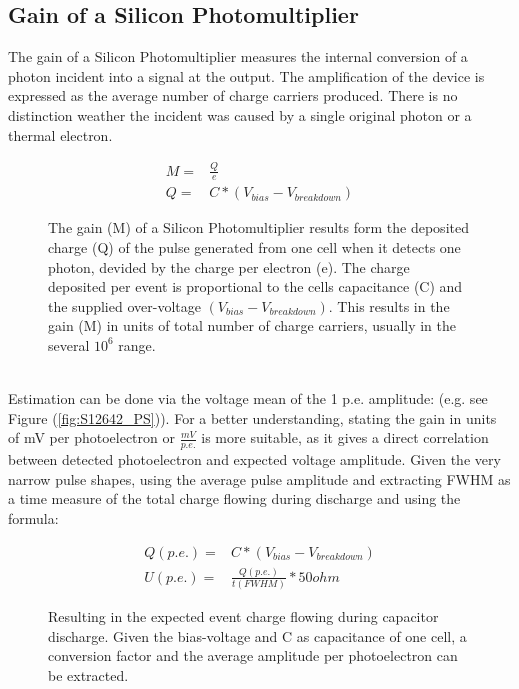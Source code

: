 \documentclass[12pt,article,type=msc,colorback,accentcolor=tud9c]{tudthesis}
\begin{document}
\subsection{Gain of a Silicon Photomultiplier}
\label{subsec:SiPMGain}
The gain of a Silicon Photomultiplier measures the internal conversion of a photon incident into a signal at the output. The amplification of the device is expressed as the average number of charge carriers produced. There is no distinction weather the incident was caused by a single original photon or a thermal electron.
\begin{figure}[h]
\begin{equation}
\begin{split}
M = & \frac{Q}{e} \\
Q = &  C * (V_{bias}-V_{breakdown})
\end{split}
\end{equation}
\label{eq:Gain_conversion_formula}
\caption{The gain (M) of a Silicon Photomultiplier results form the deposited charge (Q) of the pulse generated from one cell when it detects one photon, devided by the charge per electron (e). The charge deposited per event is proportional to the cells capacitance (C) and the supplied over-voltage $(V_{bias}-V_{breakdown})$. This results in the gain (M) in units of total number of charge carriers, usually in the several $10^6$ range.}
\end{figure}\\
Estimation can be done via the voltage mean of the 1 p.e. amplitude: (e.g. see Figure (\ref{fig:S12642_PS})). For a better understanding, stating the gain in units of mV per photoelectron or $\frac{mV}{p.e.}$ is more suitable, as it gives a direct correlation between detected photoelectron and expected voltage amplitude. Given the very narrow pulse shapes, using the average pulse amplitude and extracting FWHM as a time measure of the total charge flowing during discharge and using the formula:
\begin{figure}[h]
\begin{equation}
\begin{split}
Q(p.e.) = & C * (V_{bias}-V_{breakdown})\\
U(p.e.) = & \frac{Q(p.e.)}{t(FWHM)} * 50ohm
\end{split}
\end{equation}
\caption{Resulting in the expected event charge flowing during capacitor discharge. Given the bias-voltage and C as capacitance of one cell, a conversion factor and the average amplitude per photoelectron can be extracted.}
\end{figure}\\
\end{document}

